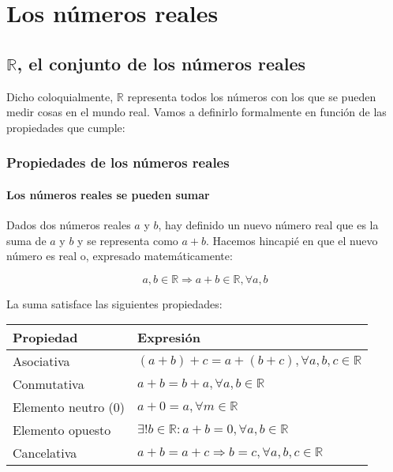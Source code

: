 \chapter{Los números reales}\label{los-numeros-reales}

\section{$\mathbb{R}$, el conjunto de los números reales}

Dicho coloquialmente, $\mathbb{R}$ representa todos los números con los que se pueden medir cosas en el mundo real.
Vamos a definirlo formalmente en función de las propiedades que cumple:

\subsection{Propiedades de los números reales}

\subsubsection{Los números reales se pueden sumar}

Dados dos números reales $a$ y $b$, hay definido un nuevo número real que es la suma de $a$ y $b$ y se representa como $a+b$.
Hacemos hincapié en que el nuevo número es real o, expresado matemáticamente:

\[a,b \in\mathbb{R} \Rightarrow a+b \in\mathbb{R}, \forall a,b\]

La suma satisface las siguientes propiedades:

\begin{center}
\begin{tabular}{l l}
	\textbf{Propiedad}  & \textbf{Expresión}                                                 \\
	\toprule
	Asociativa          & $(a+b) + c = a + (b+c), \forall a,b,c \in\mathbb{R}$               \\
	Conmutativa         & $a+b = b+a, \forall a,b \in\mathbb{R}$                             \\
	Elemento neutro (0) & $a+0 = a, \forall m \in\mathbb{R}$                                 \\
	Elemento opuesto    & $\exists! b \in\mathbb{R} : a + b = 0, \forall a, b \in\mathbb{R}$ \\
	Cancelativa         & $a+b = a+c \Rightarrow b=c, \forall a,b,c \in\mathbb{R}$           \\
\end{tabular}
\end{center}

